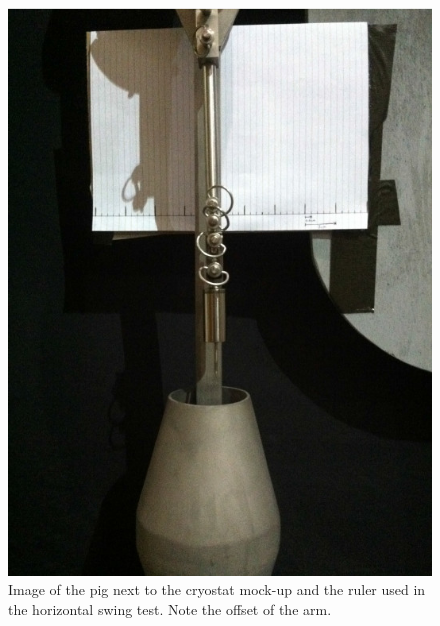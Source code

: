 \begin{itemize}
\begin{figure}[htbp]
 \centering
 \includegraphics[width=5in]{Figures/ArticulationOffset3.jpg}
 \caption{Image of the pig next to the cryostat mock-up and the ruler used in the horizontal swing test. Note the offset of the arm.}
 \label{fig:art_offset3}
\end{figure}


\end{itemize}
